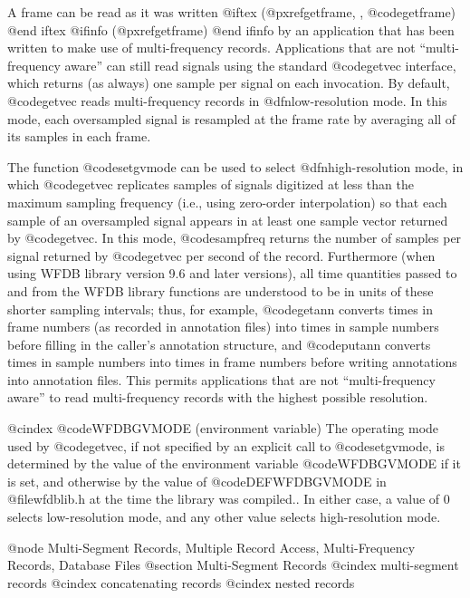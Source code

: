 {{{{{{{{{{A frame can be read as it was written
@iftex
(@pxref{getframe, , @code{getframe}})
@end iftex
@ifinfo
(@pxref{getframe})
@end ifinfo
by an application that has been written to make use of multi-frequency
records.  Applications that are not ``multi-frequency aware'' can still
read signals using the standard @code{getvec} interface, which returns
(as always) one sample per signal on each invocation.  By default,
@code{getvec} reads multi-frequency records in @dfn{low-resolution} mode.
In this mode, each oversampled signal is resampled at the frame rate by
averaging all of its samples in each frame.

The function @code{setgvmode} can be used to select @dfn{high-resolution} mode,
in which @code{getvec} replicates samples of signals digitized at less than the
maximum sampling frequency (i.e., using zero-order interpolation) so that each
sample of an oversampled signal appears in at least one sample vector returned
by @code{getvec}.  In this mode, @code{sampfreq} returns the number of samples
per signal returned by @code{getvec} per second of the record.  Furthermore
(when using WFDB library version 9.6 and later versions), all time quantities
passed to and from the WFDB library functions are understood to be in units of
these shorter sampling intervals; thus, for example, @code{getann} converts
times in frame numbers (as recorded in annotation files) into times in sample
numbers before filling in the caller's annotation structure, and @code{putann}
converts times in sample numbers into times in frame numbers before writing
annotations into annotation files.  This permits applications that are not
``multi-frequency aware'' to read multi-frequency records with the highest
possible resolution.

@cindex @code{WFDBGVMODE} (environment variable)
The operating mode used by @code{getvec}, if not specified by an explicit call
to @code{setgvmode}, is determined by the value of the environment variable
@code{WFDBGVMODE} if it is set, and otherwise by the value of
@code{DEFWFDBGVMODE} in @file{wfdblib.h} at the time the library was compiled..
In either case, a value of 0 selects low-resolution mode, and any other value
selects high-resolution mode.

@node     Multi-Segment Records, Multiple Record Access, Multi-Frequency Records, Database Files
@section Multi-Segment Records
@cindex multi-segment records
@cindex concatenating records
@cindex nested records

}}}}}}}}}}
